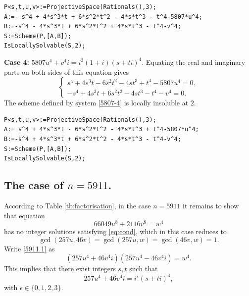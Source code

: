 \documentclass[a4paper,12pt,english,reqno]{amsart}
\begin{document}
\begin{lstlisting}
P<s,t,u,v>:=ProjectiveSpace(Rationals(),3);
A:=- s^4 + 4*s^3*t + 6*s^2*t^2 - 4*s*t^3 - t^4-5807*u^4;
B:=-s^4 - 4*s^3*t + 6*s^2*t^2 + 4*s*t^3 - t^4-v^4;
S:=Scheme(P,[A,B]);
IsLocallySolvable(S,2);
\end{lstlisting}


{\bf Case 4:} $5807u^4+v^4i=i^3(1+i)(s+ti)^4$.  Equating the real and imaginary parts on both sides of this equation gives
\begin{equation}\label{5807-4}
\begin{cases}
s^4 + 4s^3t - 6s^2t^2 - 4st^3 + t^4 - 5807u^4=0,\\
-s^4 + 4s^3t + 6s^2t^2 - 4st^3 - t^4 - v^4=0.
\end{cases}
\end{equation}
The scheme defined by system \eqref{5807-4} is locally insoluble at $2$.

\begin{lstlisting}
P<s,t,u,v>:=ProjectiveSpace(Rationals(),3);
A:= s^4 + 4*s^3*t - 6*s^2*t^2 - 4*s*t^3 + t^4-5807*u^4;
B:=-s^4 + 4*s^3*t + 6*s^2*t^2 - 4*s*t^3 - t^4-v^4;
S:=Scheme(P,[A,B]);
IsLocallySolvable(S,2);
\end{lstlisting}


\subsection{The case of $n=5911$.}%
According to Table \ref{tb:factorisation}, in the case $n=5911$ it remains to
show that equation
\begin{equation}\label{5911.1}
66049 u^8 + 2116 v^8 =w^4
\end{equation}
has no integer solutions satisfying \eqref{eq:cond}, which in this case reduces to \[\gcd(257u,46v)=\gcd(257u,w)=\gcd(46v,w)=1.\]  
Write \eqref{5911.1} as
\begin{equation} (257u^4+46v^4i)(257u^4-46v^4i)=w^4.
\end{equation}
This implies that there exist integers $s,t$ such that 
\[257u^4+46v^4i=i^{\epsilon}(s+ti)^4,\]
with $\epsilon \in \{0,1,2,3\}$.
\end{document}
